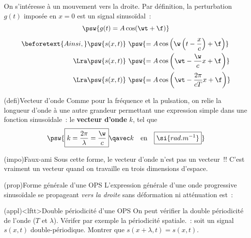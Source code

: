 \documentclass[../../main/main.tex]{subfiles}
\begin{document}
On s'intéresse à un mouvement vers la droite. Par définition, la perturbation
$g(t)$ imposée en $x=0$ est un signal sinusoïdal~:
\[\psw{g(t) = A\cos(\wt+\f)}\]
\begin{align*}
	\beforetext{Ainsi,}
	\psw{s(x,t)}~ &
	\psw{= A\cos\left(\w\left(t - \frac{x}{c}\right) +\f\right)}
	\\\Lra
	\psw{s(x,t)}~ &
	\psw{= A\cos\left(\wt - \frac{\w}{c}x +\f\right)}
	\\\Lra
	\psw{s(x,t)}~ &
	\psw{= A\cos\left(\wt - \frac{2\pi}{cT}x +\f\right)}
\end{align*}

\begin{tcb*}(defi){Vecteur d'onde}
	Comme pour la fréquence et la pulsation, on relie la longueur d'onde à une
	autre grandeur permettant une expression simple dans une fonction
	sinusoïdale~: le \textbf{vecteur d'onde} $k$, tel que
	\[
		\psw{\boxed{k = \frac{2\pi}{\lambda} = \frac{\w}{c}}
			\qavec
			k\quad\text{en}\quad\boxed{\si{rad.m^{-1}}}}
	\]
\end{tcb*}

\begin{tcb*}(impo){Faux-ami}
	Sous cette forme, le vecteur d'onde n'est pas un vecteur~!! C'est vraiment un
	vecteur quand on travaille en trois dimensions d'espace.
\end{tcb*}

\begin{tcb*}(prop){Forme générale d'une OPS}
	L'expression générale d'une onde progressive sinusoïdale se propageant
	\textit{vers la droite} sans déformation ni atténuation est~:
	\vspace{-10pt}
\end{tcb*}

\begin{tcb*}(appl)<lftt>{Double périodicité d'une OPS}
	On peut vérifier la double périodicité de l'onde ($T$ et $\lambda$). Vérifer
	par exemple la périodicité spatiale.~: soit un signal $s (x,t)$
	double-périodique. Montrer que $s (x+\lambda,t) = s (x,t)$.
	\tcblower
	\vspace{-20pt}
\end{tcb*}
\end{document}
